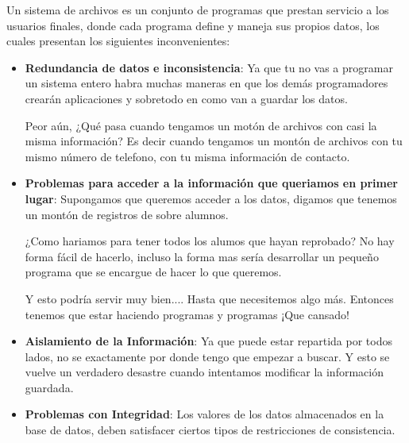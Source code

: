 \documentclass[12pt, fleqn]{report}                             %
\newcommand \Quote {\qq}                                        %
\begin{document}
            Un sistema de archivos es un conjunto de programas que prestan servicio a los usuarios
            finales, donde cada programa define y maneja sus propios datos, los cuales presentan
            los siguientes inconvenientes:

            \begin{itemize}
                \item
                    \textbf{Redundancia de datos e inconsistencia}:
                        Ya que tu no vas a programar un sistema entero habra muchas maneras
                        en que los demás programadores crearán aplicaciones y sobretodo en como
                        van a guardar los datos.

                        Peor aún, ¿Qué pasa cuando tengamos un motón de archivos con casi la misma
                        información?
                        Es decir cuando tengamos un montón de archivos con tu mismo número de telefono,
                        con tu misma información de contacto. 

                \clearpage

                \item
                    \textbf{Problemas para acceder a la información que queriamos en primer lugar}:
                        Supongamos que queremos acceder a los datos, digamos que tenemos un montón
                        de registros de sobre alumnos.

                        ¿Como hariamos para tener todos los alumos que hayan reprobado?
                        No hay forma fácil de hacerlo, incluso la forma mas \Quote{correcta} sería
                        desarrollar un pequeño programa que se encargue de hacer lo que queremos.

                        Y esto podría servir muy bien.... Hasta que necesitemos algo más.
                        Entonces tenemos que estar haciendo programas y programas ¡Que cansado!

                \item
                    \textbf{Aislamiento de la Información}:
                        Ya que puede estar repartida por todos lados, no se exactamente por donde tengo
                        que empezar a buscar. Y esto se vuelve un verdadero desastre cuando intentamos
                        modificar la información guardada.

                \item
                    \textbf{Problemas con Integridad}:
                        Los valores de los datos almacenados en la base de datos, deben satisfacer
                        ciertos tipos de restricciones de consistencia.


\end{itemize}
\end{document}
